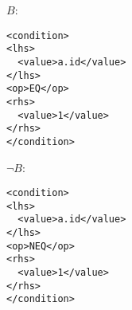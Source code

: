 \documentclass[11pt,a4paper]{article}
\begin{document}
\bigskip
\begin{minipage}{14cm}
\begin{boxedminipage}{6cm}
$B$:
\begin{lstlisting}
<condition>
<lhs>
  <value>a.id</value>
</lhs>
<op>EQ</op>
<rhs>
  <value>1</value>
</rhs>
</condition>
\end{lstlisting}
\end{boxedminipage}
%
\begin{boxedminipage}{6cm}
$\neg B$:
\begin{lstlisting}
<condition>
<lhs>
  <value>a.id</value>
</lhs>
<op>NEQ</op>
<rhs>
  <value>1</value>
</rhs>
</condition>
\end{lstlisting}
\end{boxedminipage}
\end{minipage}
\end{document}
